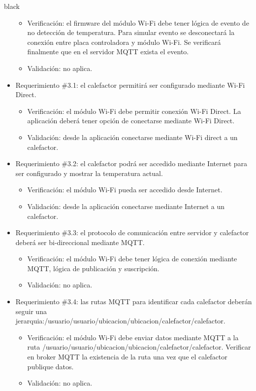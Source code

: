\documentclass[
11pt, %
codirector, %
]{charter}
\begin{document}
\begin{consigna}{black}
\begin{itemize}
\begin{itemize}
	\item Verificación: el firmware del módulo Wi-Fi debe tener lógica de evento de no detección de temperatura. Para simular evento se desconectará la conexión entre placa controladora y módulo Wi-Fi. Se verificará finalmente que en el servidor MQTT exista el evento.
	\item Validación: no aplica.
\end{itemize}

\item Requerimiento \#3.1: el calefactor permitirá ser configurado mediante Wi-Fi Direct.

\begin{itemize}
	\item Verificación: el módulo Wi-Fi debe permitir conexión Wi-Fi Direct. La aplicación deberá tener opción de conectarse mediante Wi-Fi Direct.
	\item Validación: desde la aplicación conectarse mediante Wi-Fi direct a un calefactor.
\end{itemize}

\item Requerimiento \#3.2: el calefactor podrá ser accedido mediante Internet para ser configurado y mostrar la temperatura actual.

\begin{itemize}
	\item Verificación: el módulo Wi-Fi pueda ser accedido desde Internet. 
	\item Validación: desde la aplicación conectarse mediante Internet a un calefactor.
\end{itemize}

\item Requerimiento \#3.3: el protocolo de comunicación entre servidor y calefactor deberá ser bi-direccional mediante MQTT.

\begin{itemize}
	\item Verificación: el módulo Wi-Fi debe tener lógica de conexión mediante MQTT, lógica de publicación y suscripción. 
	\item Validación: no aplica.
\end{itemize}

\item Requerimiento \#3.4: las rutas MQTT para identificar cada calefactor deberán seguir una jerarquia:/usuario/usuario/ubicacion/ubicacion/calefactor/calefactor.

\begin{itemize}
	\item Verificación: el módulo Wi-Fi debe enviar datos mediante MQTT a la ruta  /usuario/usuario/ubicacion/ubicacion/calefactor/calefactor. Verificar en broker MQTT la existencia de la ruta una vez que el calefactor publique datos.
	\item Validación: no aplica.
\end{itemize}


\end{itemize}
\end{consigna}
\end{document}
